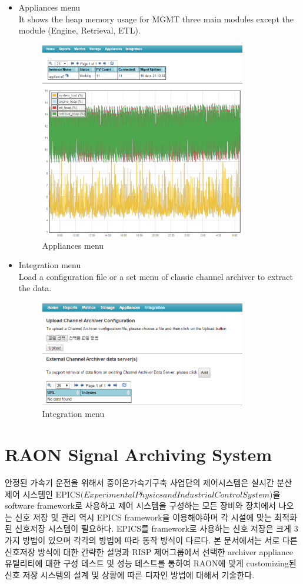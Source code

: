 \documentclass[11pt
  , a4paper
  , article
  , oneside
]{memoir}
\begin{document}
\begin{itemize}
	\item Appliances menu \\
It shows the heap memory usage for MGMT three main modules except the module (Engine, Retrieval, ETL). 
	\begin{figure}[h!]
		\centering
		\includegraphics[width=0.85\textwidth, height=0.45\textwidth]{./images/appliance.eps}
		\caption{Appliances menu}
	\end{figure}
	\clearpage
	\item Integration menu \\
	Load a configuration file or a set menu of classic channel archiver to extract the data.
	\begin{figure}[h!]
		\centering
		\includegraphics[width=0.85\textwidth, height=0.3\textheight]{./images/integration.eps}
		\caption{Integration menu}
	\end{figure}
\end{itemize}

\clearpage
\chapter{RAON Signal Archiving System}

안정된 가속기 운전을 위해서 중이온가속기구축 사업단의 제어시스템은 실시간 분산 제어 시스템인 EPICS\((Experimental Physics and Industrial Control System\))을 software framework로 사용하고 제어 시스템을 구성하는 모든 장비와 장치에서 나오는 신호 저장 및 관리 역시 EPICS framework을 이용해야하며 각 시설에 맞는 최적화된 신호저장 시스템이 필요하다. EPICS를 framework로 사용하는 신호 저장은 크게 3가지 방법이 있으며 각각의 방법에 따라 동작 방식이 다르다. 본 문서에서는 서로 다른 신호저장 방식에 대한 간략한 설명과 RISP 제어그룹에서 선택한 archiver appliance 유틸리티에 대한 구성 테스트 및 성능 테스트를 통하여 RAON에 맞게 customizing된 신호 저장 시스템의 설계 및 상황에 따른 디자인 방법에 대해서 기술한다.
\end{document}
